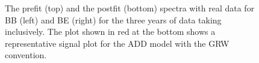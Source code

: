\begin{figure}[!htbp]{
\caption{The prefit (top) and the postfit (bottom) spectra with real data for BB (left) and BE (right) for the three years of data taking inclusively. The plot shown in red at the bottom shows a representative signal plot for the ADD model with the GRW convention.}
\label{fig:Postfit_Real_Inc} }
\end{figure}



